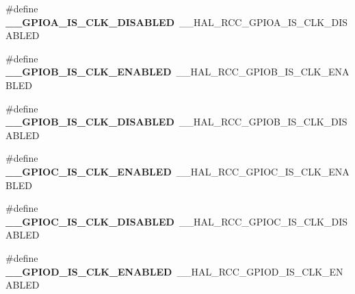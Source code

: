 \begin{DoxyCompactItemize}
\item 
\hypertarget{group___h_a_l___r_c_c___aliased_gadaaf5188daab606033dfa7736771f391}{\#define {\bfseries \-\_\-\-\_\-\-G\-P\-I\-O\-A\-\_\-\-I\-S\-\_\-\-C\-L\-K\-\_\-\-D\-I\-S\-A\-B\-L\-E\-D}~\-\_\-\-\_\-\-H\-A\-L\-\_\-\-R\-C\-C\-\_\-\-G\-P\-I\-O\-A\-\_\-\-I\-S\-\_\-\-C\-L\-K\-\_\-\-D\-I\-S\-A\-B\-L\-E\-D}\label{group___h_a_l___r_c_c___aliased_gadaaf5188daab606033dfa7736771f391}

\item 
\hypertarget{group___h_a_l___r_c_c___aliased_gaf50fd46c52bbb4387130ade81a66638b}{\#define {\bfseries \-\_\-\-\_\-\-G\-P\-I\-O\-B\-\_\-\-I\-S\-\_\-\-C\-L\-K\-\_\-\-E\-N\-A\-B\-L\-E\-D}~\-\_\-\-\_\-\-H\-A\-L\-\_\-\-R\-C\-C\-\_\-\-G\-P\-I\-O\-B\-\_\-\-I\-S\-\_\-\-C\-L\-K\-\_\-\-E\-N\-A\-B\-L\-E\-D}\label{group___h_a_l___r_c_c___aliased_gaf50fd46c52bbb4387130ade81a66638b}

\item 
\hypertarget{group___h_a_l___r_c_c___aliased_ga72a13fc60ce82c923f9c005b17a45fe0}{\#define {\bfseries \-\_\-\-\_\-\-G\-P\-I\-O\-B\-\_\-\-I\-S\-\_\-\-C\-L\-K\-\_\-\-D\-I\-S\-A\-B\-L\-E\-D}~\-\_\-\-\_\-\-H\-A\-L\-\_\-\-R\-C\-C\-\_\-\-G\-P\-I\-O\-B\-\_\-\-I\-S\-\_\-\-C\-L\-K\-\_\-\-D\-I\-S\-A\-B\-L\-E\-D}\label{group___h_a_l___r_c_c___aliased_ga72a13fc60ce82c923f9c005b17a45fe0}

\item 
\hypertarget{group___h_a_l___r_c_c___aliased_ga64b0e54296b3947741c70bdce2a3ba57}{\#define {\bfseries \-\_\-\-\_\-\-G\-P\-I\-O\-C\-\_\-\-I\-S\-\_\-\-C\-L\-K\-\_\-\-E\-N\-A\-B\-L\-E\-D}~\-\_\-\-\_\-\-H\-A\-L\-\_\-\-R\-C\-C\-\_\-\-G\-P\-I\-O\-C\-\_\-\-I\-S\-\_\-\-C\-L\-K\-\_\-\-E\-N\-A\-B\-L\-E\-D}\label{group___h_a_l___r_c_c___aliased_ga64b0e54296b3947741c70bdce2a3ba57}

\item 
\hypertarget{group___h_a_l___r_c_c___aliased_ga739b2c7a7364dc5d14f36cac8ebe1412}{\#define {\bfseries \-\_\-\-\_\-\-G\-P\-I\-O\-C\-\_\-\-I\-S\-\_\-\-C\-L\-K\-\_\-\-D\-I\-S\-A\-B\-L\-E\-D}~\-\_\-\-\_\-\-H\-A\-L\-\_\-\-R\-C\-C\-\_\-\-G\-P\-I\-O\-C\-\_\-\-I\-S\-\_\-\-C\-L\-K\-\_\-\-D\-I\-S\-A\-B\-L\-E\-D}\label{group___h_a_l___r_c_c___aliased_ga739b2c7a7364dc5d14f36cac8ebe1412}

\item 
\hypertarget{group___h_a_l___r_c_c___aliased_gad7fd9332663f795ab809dd14655259bc}{\#define {\bfseries \-\_\-\-\_\-\-G\-P\-I\-O\-D\-\_\-\-I\-S\-\_\-\-C\-L\-K\-\_\-\-E\-N\-A\-B\-L\-E\-D}~\-\_\-\-\_\-\-H\-A\-L\-\_\-\-R\-C\-C\-\_\-\-G\-P\-I\-O\-D\-\_\-\-I\-S\-\_\-\-C\-L\-K\-\_\-\-E\-N\-A\-B\-L\-E\-D}\label{group___h_a_l___r_c_c___aliased_gad7fd9332663f795ab809dd14655259bc}


\end{DoxyCompactItemize}
